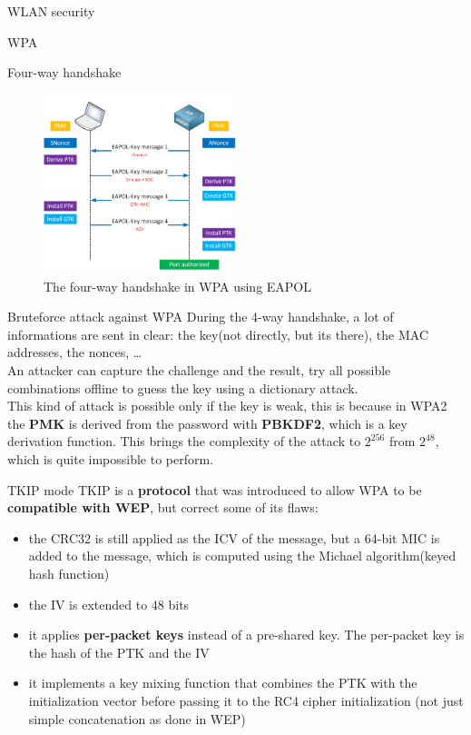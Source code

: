\begin{section}{WLAN security}
\begin{subsection}{WPA}
\begin{subsubsection}{Four-way handshake}
      \begin{figure}[h]
        \centering
        \includegraphics[width=0.5\textwidth]{img/wireless/4-way handshake.png}
        \caption{The four-way handshake in WPA using EAPOL}
      \end{figure}
    \end{subsubsection}
    \begin{subsubsection}{Bruteforce attack against WPA}
      During the 4-way handshake, a lot of informations are sent in clear: the key(not directly, but
      its there), the MAC addresses, the nonces, \dots\\
      An attacker can capture the challenge and the result, try all possible combinations offline to
      guess the key using a dictionary attack.\\
      This kind of attack is possible only if the key is weak, this is because in WPA2 the
      \textbf{PMK} is derived from the password with \textbf{PBKDF2}, which is a key derivation
      function. This brings the complexity of the attack to $2^{256}$ from $2^{48}$, which is quite
      impossible to perform.
    \end{subsubsection}
    \begin{subsubsection}{TKIP mode}
      TKIP is a \textbf{protocol} that was introduced to allow WPA to be \textbf{compatible with
      WEP}, but correct some of its flaws:
      \begin{itemize}
        \item the CRC32 is still applied as the ICV of the message, but a 64-bit MIC is added to the
          message, which is computed using the Michael algorithm(keyed hash function)
        \item the IV is extended to 48 bits
        \item it applies \textbf{per-packet keys} instead of a pre-shared key. The per-packet key is
          the hash of the PTK and the IV
        \item it implements a key mixing function that combines the PTK with the initialization
          vector before passing it to the RC4 cipher initialization (not just simple concatenation as done in WEP)


\end{itemize}
\end{subsubsection}
\end{subsection}
\end{section}
